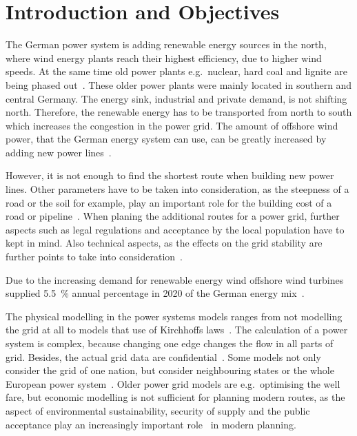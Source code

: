 \documentclass[acmtog]{acmart}
\begin{document}
	\maketitle
	
	\section{Introduction and Objectives}\label{sec:introduction}

	The German power system is adding renewable energy sources in the north, where wind energy plants reach their highest efficiency, due to higher wind speeds.
	At the same time old power plants e.g.\ nuclear, hard coal and lignite are being phased out~\cite{eser-frey_analyzing_2012}.
	These older power plants were mainly located in southern and central Germany. 
	The energy sink,  industrial and private demand, is not shifting north.
	Therefore, the renewable energy has to be transported from north to south which increases the congestion in the power grid. 
	The amount of offshore wind power, that the German energy system can use, can be greatly increased by adding new power lines~\cite{leuthold_nodal_2005}.
	
	However, it is not enough to find the shortest route when building new power lines.
	Other parameters have to be taken into consideration, as the steepness of a road or the soil for example, play an important role for the building cost of a road or pipeline~\cite{suleiman_optimal_2015}.
	When planing the additional routes for a power grid, further aspects such as legal regulations and acceptance
	by the local population have to kept in mind.
	Also technical aspects, as the effects on the grid stability are further points to take into consideration~\cite{schafer_understanding_2022}.
	
	Due to the increasing demand for renewable energy wind offshore wind turbines supplied 5.5~\% annual percentage in 2020 of the German energy mix~\cite{noauthor_nettostromerzeugung_2021}.

	 The physical modelling in the power systems models ranges from not modelling the grid at all to models that use of Kirchhoffs laws~\cite{bertsch_participatory_2016}.
	The calculation of a power system is complex, because changing one edge changes the flow in all parts of grid.
	Besides, the actual grid data are confidential~\cite{bertsch_participatory_2016}.
	Some models not only consider the grid of one nation, but consider neighbouring states or the whole European power system~\cite{dietrich_will_2010}.	
	Older power grid models are e.g.\ optimising the well fare, but economic modelling is not sufficient for planning modern routes, as the aspect of environmental sustainability, security of supply and the public acceptance play an increasingly important role~\cite{hauff_gesellschaftliche_2011} in modern planning.
	
\end{document}
